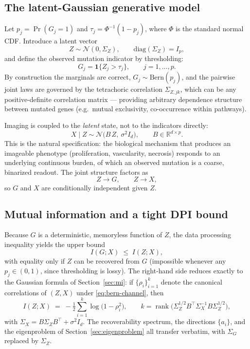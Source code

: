 \documentclass{article}
\newcommand{\R}{\mathbb{R}}
\newcommand{\rank}{\operatorname{rank}}
\begin{document}
\subsection{The latent-Gaussian generative model}
\label{sec:bern-model}

Let $p_j = \Pr(G_j = 1)$ and $\tau_j = \Phi^{-1}(1-p_j)$, where $\Phi$ is the
standard normal CDF. Introduce a latent vector
\[
  Z \sim \mathcal N(0, \Sigma_Z), \qquad
  \mathrm{diag}(\Sigma_Z) = I_p,
\]
and define the observed mutation indicator by thresholding:
\[
  G_j = \mathbf{1}\!\{Z_j > \tau_j\}, \qquad j = 1,\ldots,p.
\]
By construction the marginals are correct, $G_j \sim \mathrm{Bern}(p_j)$, and
the pairwise joint laws are governed by the tetrachoric correlation $\Sigma_{Z,jk}$,
which can be any positive-definite correlation matrix --- providing arbitrary
dependence structure between mutated genes (e.g.\ mutual exclusivity,
co-occurrence within pathways).

Imaging is coupled to the \emph{latent} state, not to the indicators directly:
\begin{equation}
  X \mid Z \sim \mathcal N\!\bigl(B\,Z,\ \sigma^2 I_d\bigr),
  \qquad
  B \in \R^{d \times p}.
  \label{eq:bern-channel}
\end{equation}
This is the natural specification: the biological mechanism that produces an
imageable phenotype (proliferation, vascularity, necrosis) responds to an
underlying continuous burden, of which an observed mutation is a coarse,
binarized readout. The joint structure factors as
\[
  Z \to G,\qquad Z \to X,
\]
so $G$ and $X$ are conditionally independent given $Z$.

\subsection{Mutual information and a tight DPI bound}
\label{sec:bern-mi}

Because $G$ is a deterministic, memoryless function of $Z$, the data
processing inequality yields the upper bound
\begin{equation}
  I(G;X) \;\le\; I(Z;X),
  \label{eq:bern-dpi}
\end{equation}
with equality only if $Z$ can be recovered from $G$ (impossible whenever any
$p_j \in (0,1)$, since thresholding is lossy). The right-hand side reduces
exactly to the Gaussian formula of Section~\ref{sec:mi}: if $\{\rho_i\}_{i=1}^{k}$
denote the canonical correlations of $(Z,X)$ under \eqref{eq:bern-channel}, then
\begin{equation}
  I(Z;X) \;=\; -\tfrac{1}{2}\sum_{i=1}^{k} \log\bigl(1-\rho_i^2\bigr),
  \qquad
  k = \rank\bigl(\Sigma_Z^{1/2} B^\top \Sigma_X^{-1} B \Sigma_Z^{1/2}\bigr),
  \label{eq:bern-mi}
\end{equation}
with $\Sigma_X = B \Sigma_Z B^\top + \sigma^2 I_d$. The recoverability spectrum,
the directions $\{a_i\}$, and the eigenproblem of
Section~\ref{sec:eigenproblem} all transfer verbatim, with $\Sigma_G$ replaced
by $\Sigma_Z$.
\end{document}
